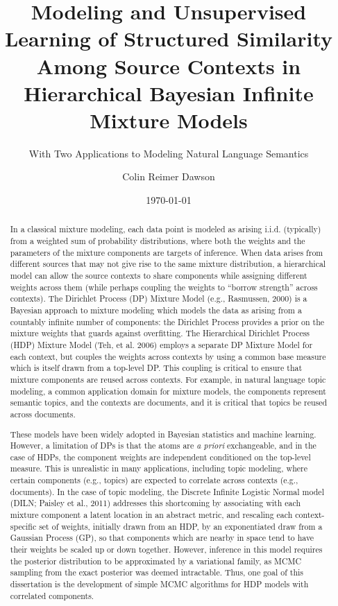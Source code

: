 \documentclass[12pt,letterpaper]{report}
\title{Modeling and Unsupervised Learning of Structured Similarity Among
  Source Contexts in Hierarchical Bayesian Infinite Mixture Models}
\subtitle{With Two Applications to Modeling Natural Language Semantics}
\author{Colin Reimer Dawson}
\date{\today}
\begin{document}
\maketitle

\begin{abstract}
In a classical mixture modeling, each data point is modeled as arising
i.i.d. (typically) from a weighted sum of probability distributions,
where both the weights and the parameters of the mixture components
are targets of inference.  When data arises from different sources
that may not give rise to the same mixture distribution, a
hierarchical model can allow the source contexts to share components while
assigning different weights across them (while perhaps coupling the
weights to ``borrow strength'' across contexts).  The Dirichlet
Process (DP) Mixture Model (e.g., Rasmussen, 2000) is a Bayesian
approach to mixture modeling which models the data as arising from a countably
infinite number of components: the Dirichlet Process provides a prior
on the mixture weights that guards against overfitting.  The Hierarchical 
Dirichlet Process (HDP) Mixture Model (Teh, et al. 2006) employs
a separate DP Mixture Model for each context, but
couples the weights across contexts by using a common base measure which is
itself drawn from a top-level DP.  This coupling is critical to ensure
that mixture components are reused across contexts.
For example, in natural language topic modeling, a common application
domain for mixture models, the components represent semantic topics,
and the contexts are documents, and it is critical that topics be reused
across documents.

These models have been widely adopted in Bayesian statistics and
machine learning.  However, a limitation of DPs is that the atoms
are {\it a priori} exchangeable, and in the case of HDPs, the
component weights are independent conditioned on the top-level
measure.  This is unrealistic in many applications, including topic modeling, where certain
components (e.g., topics) are expected to correlate across contexts
(e.g., documents).  In the case of topic modeling, the Discrete
Infinite Logistic Normal model (DILN; Paisley et al., 2011) addresses
this shortcoming by associating with each mixture component a latent
location in an abstract metric, and rescaling each context-specific
set of weights, initially drawn from an HDP, 
by an exponentiated draw from a Gaussian Process (GP), so that
components which are nearby in space tend to have their weights be
scaled up or down together.  However, inference in this model requires
the posterior distribution to be approximated by a variational family,
as MCMC sampling from the exact posterior was deemed intractable.
Thus, one goal of this dissertation is the development of simple MCMC
algorithms for HDP models with correlated components.


\end{abstract}
\end{document}
